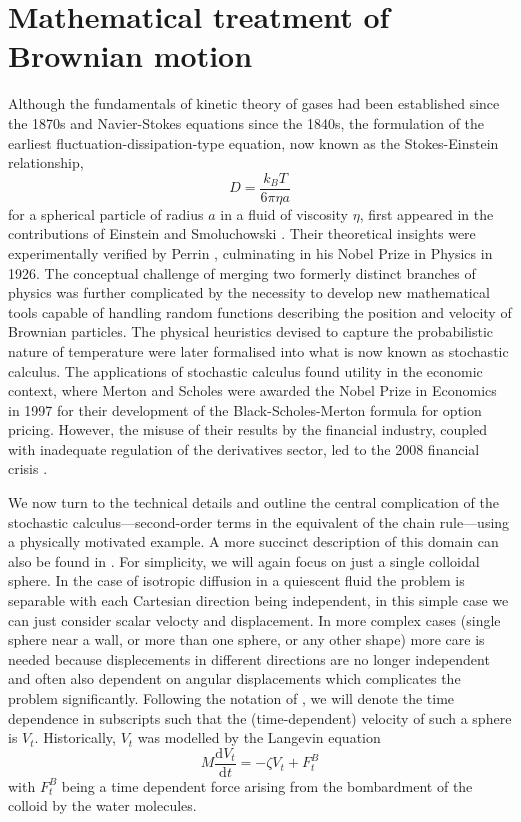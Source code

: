 \documentclass{doctoral}
\newcommand{\dd}{\mathrm{d}}
\begin{document}
\section{Mathematical treatment of Brownian motion}
\label{sec:SDE}

Although the fundamentals of kinetic theory of gases had been established since the 1870s and Navier-Stokes equations since the 1840s, the formulation of the earliest fluctuation-dissipation-type equation, now known as the Stokes-Einstein relationship,
\begin{equation}\label{eq:stokeseinstein}
    D = \frac{k_B T}{6\pi\eta a}
\end{equation}
 for a spherical particle of radius $a$ in a fluid of viscosity $\eta$, first appeared in the contributions of Einstein \cite{Einstein_1905} and Smoluchowski \cite{Smoluchowski_1906}.
Their theoretical insights were experimentally verified by Perrin \cite{Perrin_1909}, culminating in his Nobel Prize in Physics in 1926.
The conceptual challenge of merging two formerly distinct branches of physics was further complicated by the necessity to develop new mathematical tools capable of handling random functions describing the position and velocity of Brownian particles.
The physical heuristics devised to capture the probabilistic nature of temperature were later formalised into what is now known as stochastic calculus.
The applications of stochastic calculus found utility in the economic context, where Merton and Scholes were awarded the Nobel Prize in Economics in 1997 for their development of the Black-Scholes-Merton formula for option pricing.
However, the misuse of their results by the financial industry, coupled with inadequate regulation of the derivatives sector, led to the 2008 financial crisis \cite{fcic_report}.

We now turn to the technical details and outline the central complication of the stochastic calculus––second-order terms in the equivalent of the chain rule––using a physically motivated example.
A more succinct description of this domain can also be found in \textcite{Waszkiewicz_2023_pychastic}.
For simplicity, we will again focus on just a single colloidal sphere.
In the case of isotropic diffusion in a quiescent fluid the problem is separable with each Cartesian direction being independent, in this simple case we can just consider scalar velocty and displacement.
In more complex cases (single sphere near a wall, or more than one sphere, or any other shape) more care is needed because displecements in different directions are no longer independent and often also dependent on angular displacements which complicates the problem significantly.
Following the notation of \textcite{Ottinger_2012}, we will denote the time dependence in subscripts such that the (time-dependent) velocity of such a sphere is $V_t$.
Historically, $V_t$ was modelled by the Langevin equation
\begin{equation}
    M \frac{\dd V_t}{\dd t} = - \zeta V_t + F^{B}_t \label{eqn:langevin-velocity}
\end{equation}
with $F^B_t$ being a time dependent force arising from the bombardment of the colloid by the water molecules.
\end{document}
